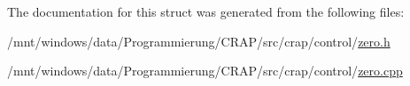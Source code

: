 The documentation for this struct was generated from the following files\-:\begin{DoxyCompactItemize}
\item 
/mnt/windows/data/\-Programmierung/\-C\-R\-A\-P/src/crap/control/\hyperlink{zero_8h}{zero.\-h}\item 
/mnt/windows/data/\-Programmierung/\-C\-R\-A\-P/src/crap/control/\hyperlink{zero_8cpp}{zero.\-cpp}\end{DoxyCompactItemize}
